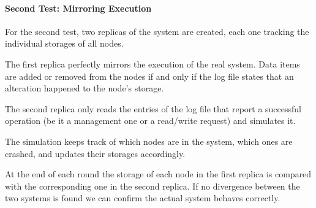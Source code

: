 \documentclass{article}
\begin{document}
\paragraph {Second Test: Mirroring Execution}
For the second test, two replicas of the system are created, each one tracking
the individual storages of all nodes.

The first replica perfectly mirrors the execution of the real system. Data items
are added or removed from the nodes if and only if the log file states that an
alteration happened to the node's storage.

The second replica only reads the entries of the log file that report a
successful operation (be it a management one or a read/write request) and
simulates it.

The simulation keeps track of which nodes are in the system, which ones are
crashed, and updates their storages accordingly.

At the end of each round the storage of each node in the first replica is
compared with the corresponding one in the second replica. If no divergence
between the two systems is found we can confirm the actual system behaves
correctly.
\end{document}
